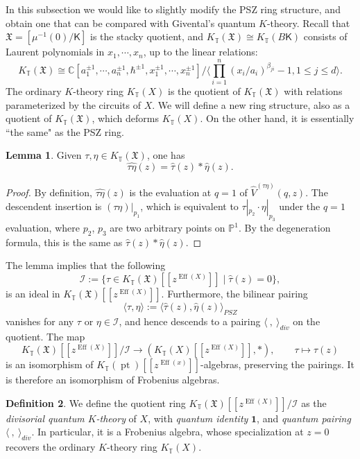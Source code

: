 \documentclass[10pt]{amsart}
\theoremstyle{definition}
\def\PP{{\mathbb{P}}}
\def\CC{{\mathbb{C}}}
\def\TT{\mathbb{T}}
\newcommand{\bone}{\mathbf{1}}
\newcommand{\cI}{\mathcal{I}}
\newcommand{\Eff}{\operatorname{Eff}}
\newcommand{\pt}{\operatorname{pt}}
\newcommand{\fX}{\mathfrak{X}}
\newcommand{\bK}{\mathsf{K}}
\theoremstyle{definition}
\newtheorem{Definition}{Definition}[section]
\numberwithin{equation}{section}
\theoremstyle{Theorem}
\newtheorem{Lemma}[Definition]{Lemma}
\begin{document}
In this subsection we would like to slightly modify the PSZ ring structure, and obtain one that can be compared with Givental's quantum $K$-theory. Recall that $\fX = [\mu^{-1} (0) / \bK ]$ is the stacky quotient, and $K_\TT (\fX) \cong K_\TT (B \bK)$ consists of Laurent polynomials in $x_1, \cdots, x_n$, up to the linear relations:
$$
K_\TT (\fX) \cong \CC [ a_1^{\pm 1}, \cdots, a_n^{\pm 1}, \hbar^{\pm 1}, x_1^{\pm 1}, \cdots, x_n^{\pm 1} ] / \langle \prod_{i=1}^n (x_i / a_i)^{\beta_{ji}} - 1, 1\leq j\leq d  \rangle.
$$
The ordinary $K$-theory ring $K_\TT (X)$ is the quotient of $K_\TT (\fX)$ with relations parameterized by the circuits of $X$. We will define a new ring structure, also as a quotient of $K_\TT (\fX)$, which deforms $K_\TT (X)$. On the other hand, it is essentially ``the same" as the PSZ ring.

\begin{Lemma} \label{quantum-prod}
Given $\tau, \eta \in K_\TT (\fX)$, one has
$$
\widehat{\tau \eta} (z) = \widehat\tau (z) * \widehat\eta (z).
$$
\end{Lemma}

\begin{proof}
By definition, $\widehat{\tau \eta} (z)$ is the evaluation at $q = 1$ of $\widehat V^{(\tau\eta)} (q, z)$. The descendent insertion is $(\tau \eta) |_{p_1}$, which is equivalent to $\tau |_{p_2} \cdot \eta |_{p_3}$ under the $q=1$ evaluation, where $p_2$, $p_3$ are two arbitrary points on $\PP^1$. By the degeneration formula, this is the same as $\widehat\tau (z) * \widehat\eta (z)$.
\end{proof}

The lemma implies that the following
$$
\cI := \{ \tau \in K_\TT (\fX) [[z^{\Eff(X)}]] \mid \hat\tau (z) = 0  \},
$$
is an ideal in $K_\TT (\fX)  [[z^{\Eff(X)}]] $. Furthermore, the bilinear pairing
$$
\langle \tau, \eta \rangle := \langle \hat\tau (z), \hat\eta (z) \rangle_{PSZ}
$$
vanishes for any $\tau$ or $\eta\in \cI$, and hence descends to a pairing $\langle \ , \ \rangle_{div}$ on the quotient. The map
\begin{equation} \label{isom}
K_\TT (\fX)  [[z^{\Eff(X)}]] / \cI \to (K_\TT (X) [[z^{\Eff (X)} ]], * ) , \qquad \tau \mapsto \hat\tau (z)
\end{equation}
is an isomorphism of $K_\TT (\pt) [[z^{\Eff (x)}]]$-algebras, preserving the pairings. It is therefore an isomorphism of Frobenius algebras.

\begin{Definition}
We define the quotient ring $K_\TT (\fX)  [[z^{\Eff(X)}]] / \cI$ as the \emph{divisorial quantum $K$-theory} of $X$, with \emph{quantum identity} $\bone$, and \emph{quantum pairing} $\langle \ , \ \rangle_{div}$. In particular, it is a Frobenius algebra, whose specialization at $z = 0$ recovers the ordinary $K$-theory ring $K_\TT (X)$.
\end{Definition}
\end{document}
